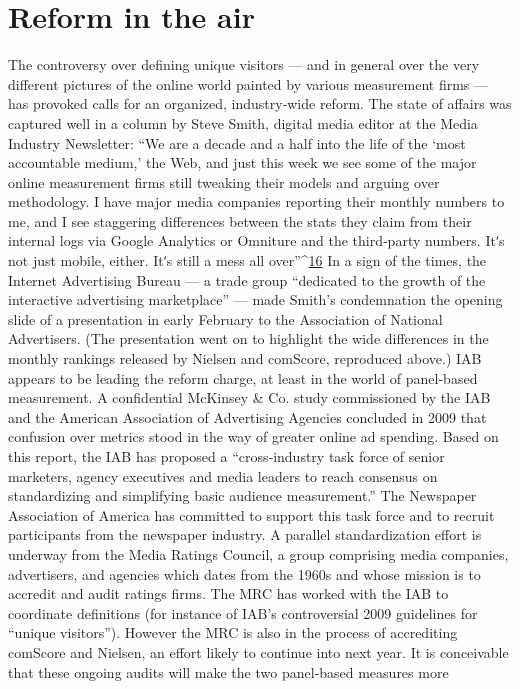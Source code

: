 \section{Reform in the air}
The controversy over defining unique visitors — and in general over the
very different pictures of the online world painted by various
measurement firms — has provoked calls for an organized, industry‐wide
reform. The state of affairs was captured well in a column by Steve Smith,
digital media editor at the Media Industry Newsletter:
``We are a decade and a half into the life of the ‘most accountable
medium,’ the Web, and just this week we see some of the major
online measurement firms still tweaking their models and arguing
over methodology. I have major media companies reporting their
monthly numbers to me, and I see staggering differences between
the stats they claim from their internal logs via Google Analytics or
Omniture and the third‐party numbers. Itʹs not just mobile, either.
Itʹs still a mess all over''^{\href{#endnotes}{16}}
In a sign of the times, the Internet Advertising Bureau — a trade group
``dedicated to the growth of the interactive advertising marketplace'' —
made Smith’s condemnation the opening slide of a presentation in early
February to the Association of National Advertisers. (The presentation
went on to highlight the wide differences in the monthly rankings
released by Nielsen and comScore, reproduced above.)
IAB appears to be leading the reform charge, at least in the world of
panel‐based measurement. A confidential McKinsey & Co. study
commissioned by the IAB and the American Association of Advertising
Agencies concluded in 2009 that confusion over metrics stood in the way
of greater online ad spending. Based on this report, the IAB has proposed
a ``cross‐industry task force of senior marketers, agency executives and
media leaders to reach consensus on standardizing and simplifying basic
audience measurement.'' The Newspaper Association of America has
committed to support this task force and to recruit participants from the
newspaper industry.
A parallel standardization effort is underway from the Media Ratings
Council, a group comprising media companies, advertisers, and agencies
which dates from the 1960s and whose mission is to accredit and audit
ratings firms. The MRC has worked with the IAB to coordinate definitions
(for instance of IAB’s controversial 2009 guidelines for ``unique visitors'').
However the MRC is also in the process of accrediting comScore and
Nielsen, an effort likely to continue into next year. It is conceivable that
these ongoing audits will make the two panel‐based measures more
